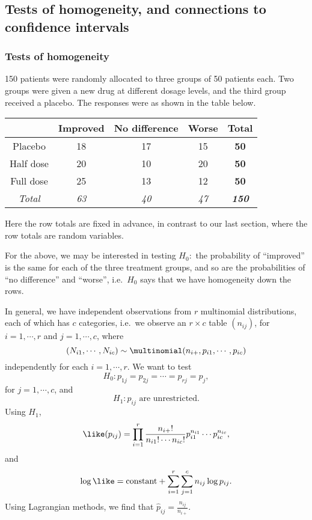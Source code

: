 \documentclass[a4paper]{article}
\begin{document}
\subsection{Tests of homogeneity, and connections to confidence intervals}
\subsubsection{Tests of homogeneity}
\begin{eg}
  150 patients were randomly allocated to three groups of 50 patients each. Two groups were given a new drug at different dosage levels, and the third group received a placebo. The responses were as shown in the table below.
  \begin{center}
    \begin{tabular}{ccccc}
      \toprule
      & Improved & No difference & Worse & \textbf{Total}\\\midrule
      Placebo & 18 & 17 & 15 & \textbf{50}\\
      Half dose & 20 & 10 & 20 & \textbf{50}\\
      Full dose & 25 & 13 & 12& \textbf{50}\\\midrule
      \textit{Total} & \textit{63} & \textit{40} & \textit{47} & \textbf{\textit{150}}\\\bottomrule
    \end{tabular}
  \end{center}
  Here the row totals are fixed in advance, in contrast to our last section, where the row totals are random variables.

  For the above, we may be interested in testing $H_0:$ the probability of ``improved'' is the same for each of the three treatment groups, and so are the probabilities of ``no difference'' and ``worse'', i.e.\ $H_0$ says that we have homogeneity down the rows.
\end{eg}
In general, we have independent observations from $r$ multinomial distributions, each of which has $c$ categories, i.e.\ we observe an $r\times c$ table $(n_{ij})$, for $i = 1, \cdots, r$ and $j = 1, \cdots, c$, where
\[
  (N_{i1}, \cdots, N_{ic}) \sim \multinomial(n_{i+}, p_{i1}, \cdots, p_{ic})
\]
independently for each $i = 1, \cdots, r$.
We want to test
\[
  H_0: p_{1j} = p_{2j} = \cdots = p_{rj} = p_j,
\]
for $j = 1, \cdots, c$, and
\[
  H_1: p_{ij}\text{ are unrestricted}.
\]
Using $H_1$,
\[
  \like(p_{ij}) = \prod_{i = 1}^r \frac{n_{i+}!}{n_{i1}!\cdots n_{ic}!}p_{i1}^{n_{i1}} \cdots p_{ic}^{n_{ic}},
\]
and
\[
  \log\like = \text{constant} + \sum_{i = 1}^r \sum_{j = 1}^c n_{ij}\log p_{ij}.
\]
Using Lagrangian methods, we find that $\hat{p}_{ij} = \frac{n_{ij}}{n_{i+}}$.
\end{document}
